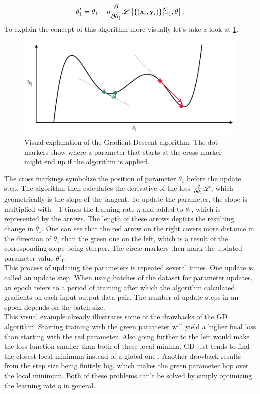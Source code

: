 \begin{equation}
	\theta_1' = \theta_1 - \eta \frac{\partial}{\partial\theta_1} \mathscr{L}\left[ \{(\mathbf{x}_i, \mathbf{y}_i)\}_{i=1}^{N}, \theta \right].
\end{equation}
To explain the concept of this algorithm more visually let's take a look at \cref{fig:gd_explanation_plot}. 
\begin{figure}
	\centering
	\includegraphics[width = \textwidth]{text/MachineLearningBasics/plots/sgd_plot.pdf}
	\caption{Visual explanation of the Gradient Descent algorithm. The dot markers show where a parameter that starts at the cross marker might end up if the algorithm is applied.}
	\label{fig:gd_explanation_plot}
\end{figure}
The cross markings symbolize the position of parameter $\theta_1$ before the update step. The algorithm then calculates the derivative of the loss $\frac{\partial}{\partial\theta_1} \mathscr{L}$, which geometrically is the slope of the tangent. To update the parameter, the slope is multiplied with $-1$ times the learning rate $\eta$ and added to $\theta_1$, which is represented by the arrows. The length of these arrows depicts the resulting change in $\theta_1$. One can see that the red arrow on the right covers more distance in the direction of $\theta_1$ than the green one on the left, which is a result of the corresponding slope being steeper. The circle markers then mark the updated parameter value $\theta'_1$.\\
This process of updating the parameters is repeated several times. One update is called an update step. When using batches of the dataset for parameter updates, an epoch refers to a period of training after which the algorithm calculated gradients on each input-output data pair. The number of update steps in an epoch depends on the batch size.\\ 
This visual example already illustrates some of the drawbacks of the GD algorithm: Starting training with the green parameter will yield a higher final loss than starting with the red parameter. Also going further to the left would make the loss function smaller than both of these local minima. GD just tends to find the closest local minimum instead of a global one \cite{SGDLocalMinima}. Another drawback results from the step size being finitely big, which makes the green parameter hop over the local minimum. Both of these problems can't be solved by simply optimizing the learning rate $\eta$ in general.

